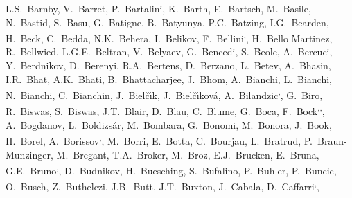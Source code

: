 \begin{flushleft}
L.S.~Barnby\And, 
V.~Barret\And, 
P.~Bartalini\And, 
K.~Barth\And, 
E.~Bartsch\And, 
M.~Basile\And, 
N.~Bastid\And, 
S.~Basu\And, 
G.~Batigne\And, 
B.~Batyunya\And, 
P.C.~Batzing\And, 
I.G.~Bearden\And, 
H.~Beck\And, 
C.~Bedda\And, 
N.K.~Behera\And, 
I.~Belikov\And, 
F.~Bellini\textsuperscript{,}\And, 
H.~Bello Martinez\And, 
R.~Bellwied\And, 
L.G.E.~Beltran\And, 
V.~Belyaev\And, 
G.~Bencedi\And, 
S.~Beole\And, 
A.~Bercuci\And, 
Y.~Berdnikov\And, 
D.~Berenyi\And, 
R.A.~Bertens\And, 
D.~Berzano\And, 
L.~Betev\And, 
A.~Bhasin\And, 
I.R.~Bhat\And, 
A.K.~Bhati\And, 
B.~Bhattacharjee\And, 
J.~Bhom\And, 
A.~Bianchi\And, 
L.~Bianchi\And, 
N.~Bianchi\And, 
C.~Bianchin\And, 
J.~Biel\v{c}\'{\i}k\And, 
J.~Biel\v{c}\'{\i}kov\'{a}\And, 
A.~Bilandzic\textsuperscript{,}\And, 
G.~Biro\And, 
R.~Biswas\And, 
S.~Biswas\And, 
J.T.~Blair\And, 
D.~Blau\And, 
C.~Blume\And, 
G.~Boca\And, 
F.~Bock\textsuperscript{,}\textsuperscript{,}\And, 
A.~Bogdanov\And, 
L.~Boldizs\'{a}r\And, 
M.~Bombara\And, 
G.~Bonomi\And, 
M.~Bonora\And, 
J.~Book\And, 
H.~Borel\And, 
A.~Borissov\textsuperscript{,}\And, 
M.~Borri\And, 
E.~Botta\And, 
C.~Bourjau\And, 
L.~Bratrud\And, 
P.~Braun-Munzinger\And, 
M.~Bregant\And, 
T.A.~Broker\And, 
M.~Broz\And, 
E.J.~Brucken\And, 
E.~Bruna\And, 
G.E.~Bruno\textsuperscript{,}\And, 
D.~Budnikov\And, 
H.~Buesching\And, 
S.~Bufalino\And, 
P.~Buhler\And, 
P.~Buncic\And, 
O.~Busch\And, 
Z.~Buthelezi\And, 
J.B.~Butt\And, 
J.T.~Buxton\And, 
J.~Cabala\And, 
D.~Caffarri\textsuperscript{,}\And, 

\end{flushleft}
